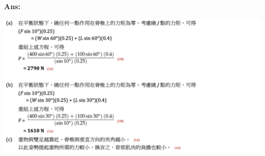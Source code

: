 {
    \clearpage{}
}{
    \textbf{Ans:}\par{\par\centering\includegraphics[width=\textwidth]{./img/ch3_moment_lq_2024-05-11-20-24-08.png}\par}
}

